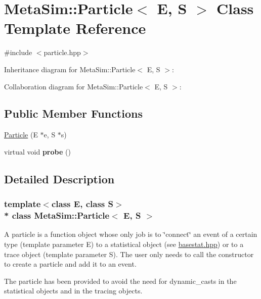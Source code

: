 \hypertarget{classMetaSim_1_1Particle}{}\section{Meta\+Sim\+:\+:Particle$<$ E, S $>$ Class Template Reference}
\label{classMetaSim_1_1Particle}


{\ttfamily \#include $<$particle.\+hpp$>$}



Inheritance diagram for Meta\+Sim\+:\+:Particle$<$ E, S $>$\+:


Collaboration diagram for Meta\+Sim\+:\+:Particle$<$ E, S $>$\+:
\subsection*{Public Member Functions}
\begin{DoxyCompactItemize}
\item 
\hyperlink{classMetaSim_1_1Particle_a0ac0e50800d20b623d907fb231fe890c}{Particle} (E $\ast$e, S $\ast$s)
\item 
virtual void {\bfseries probe} ()\hypertarget{classMetaSim_1_1Particle_ac9f1c3ff5fd5080147777f9a6ee37dba}{}\label{classMetaSim_1_1Particle_ac9f1c3ff5fd5080147777f9a6ee37dba}

\end{DoxyCompactItemize}


\subsection{Detailed Description}
\subsubsection*{template$<$class E, class S$>$\\*
class Meta\+Sim\+::\+Particle$<$ E, S $>$}

A particle is a function object whose only job is to \char`\"{}connect\char`\"{} an event of a certain type (template parameter E) to a statistical object (see \hyperlink{basestat_8hpp_source}{basestat.\+hpp}) or to a trace object (template parameter S). The user only needs to call the constructor to create a particle and add it to an event.

The particle has been provided to avoid the need for dynamic\+\_\+casts in the statistical objects and in the tracing objects.

